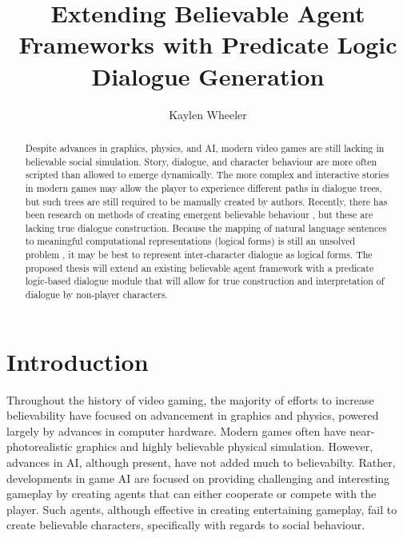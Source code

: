 \documentclass{article}
\begin{document}
\title{Extending Believable Agent Frameworks with Predicate
  Logic Dialogue Generation}
\author{Kaylen Wheeler}

\maketitle

\begin{abstract}

Despite advances in graphics, physics, and AI, modern video games are
still lacking in believable social simulation.  Story, dialogue, and
character behaviour are more often scripted than allowed to emerge
dynamically.  The more complex and interactive stories in modern games
may allow the player to experience different paths in dialogue trees,
but such trees are still required to be manually created by authors.
Recently, there has been research on methods of creating emergent
believable behaviour \cite{Acton2009,Mascarenhas,Mateasc}, but these are
lacking true dialogue construction.  Because the mapping of natural
language sentences to meaningful computational representations
(logical forms) is still an unsolved problem \cite{Zettlemoyer2004}, it
may be best to represent inter-character dialogue as logical forms.
The proposed thesis will extend an existing believable agent
framework with a predicate logic-based dialogue module that will
allow for true construction and interpretation of dialogue by
non-player characters.

\end{abstract}

\section{Introduction}

Throughout the history of video gaming, the majority of efforts to
increase believability have focused on advancement in graphics and
physics, powered largely by advances in computer hardware.  Modern
games often have near-photorealistic graphics and highly believable
physical simulation.  However, advances in AI, although present, have
not added much to believabilty.  Rather, developments in game AI are
focused on providing challenging and interesting gameplay by creating
agents that can either cooperate or compete with the player.  Such
agents, although effective in creating entertaining gameplay, fail to
create believable characters, specifically with regards to social
behaviour.
\end{document}
